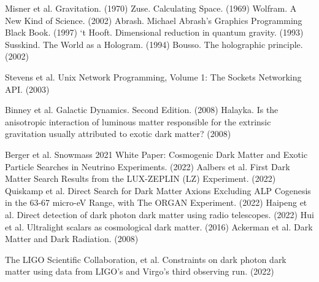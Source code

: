 \documentclass[12pt]{article}
\begin{document}
\begin{thebibliography}{9}
 Misner et al. Gravitation. (1970)
 Zuse. Calculating Space. (1969)
 Wolfram. A New Kind of Science. (2002)
 Abrash. Michael Abrash's Graphics Programming Black Book. (1997)
 `t Hooft. Dimensional reduction in quantum gravity. (1993)
 Susskind. The World as a Hologram. (1994)
 Bousso. The holographic principle. (2002)

 Stevens et al. Unix Network Programming, Volume 1: The Sockets Networking API. (2003)

 Binney et al. Galactic Dynamics. Second Edition. (2008)
 Halayka. Is the anisotropic interaction of luminous matter responsible for the extrinsic gravitation usually attributed to exotic dark matter? (2008)

 Berger et al. Snowmass 2021 White Paper: Cosmogenic Dark Matter and Exotic Particle Searches in Neutrino Experiments. (2022)
 Aalbers et al. First Dark Matter Search Results from the LUX-ZEPLIN (LZ) Experiment. (2022)
 Quiskamp et al. Direct Search for Dark Matter Axions Excluding ALP Cogenesis in the 63-67 micro-eV Range, with The ORGAN Experiment. (2022)
 Haipeng et al. Direct detection of dark photon dark matter using radio telescopes. (2022)
 Hui et al. Ultralight scalars as cosmological dark matter. (2016)
 Ackerman et al. Dark Matter and Dark Radiation. (2008)

 The LIGO Scientific Collaboration, et al. Constraints on dark photon dark matter using data from LIGO's and Virgo's third observing run. (2022)


\end{thebibliography}
\end{document}
